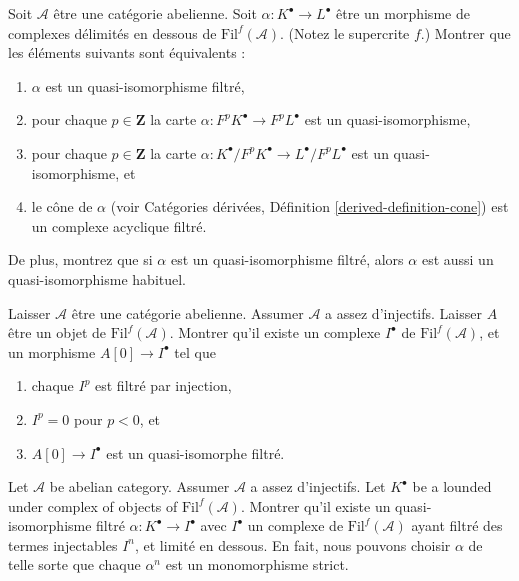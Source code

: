 \begin{exercise}
\label{exercise-filtered-quasi-isomorphism}
Soit $\mathcal{A}$ être une catégorie abelienne.
Soit $\alpha : K^\bullet \to L^\bullet$ être un morphisme de complexes
délimités en dessous de $\text{Fil}^f(\mathcal{A})$. (Notez le supercrite $f$.) Montrer que
les éléments suivants sont équivalents :
\begin{enumerate}
\item $\alpha$ est un quasi-isomorphisme filtré,
\item pour chaque $p \in \mathbf{Z}$
la carte $\alpha : F^pK^\bullet \to F^pL^\bullet$ est un quasi-isomorphisme,
\item pour chaque $p \in
\mathbf{Z}$ la carte $\alpha : K^\bullet/F^pK^\bullet \to L^\bullet/F^pL^\bullet$
est un quasi-isomorphisme, et
\item le cône de
$\alpha$ (voir Catégories dérivées, Définition \ref{derived-definition-cone}) est
un complexe acyclique filtré.
\end{enumerate}
De plus, montrez que si $\alpha$ est un quasi-isomorphisme filtré,
alors $\alpha$ est aussi un quasi-isomorphisme habituel.
\end{exercise}

\begin{exercise}
\label{exercise-injective-resolution}
Laisser $\mathcal{A}$ être une catégorie abelienne.
Assumer $\mathcal{A}$ a assez d'injectifs.
Laisser $A$ être un objet de $\text{Fil}^f(\mathcal{A})$.
Montrer qu'il existe un
complexe $I^\bullet$ de $\text{Fil}^f(\mathcal{A})$, et un
morphisme $A[0] \to I^\bullet$ tel que
\begin{enumerate}
\item chaque $I^p$ est filtré par injection,
\item $I^p = 0$ pour $p < 0$, et
\item $A[0] \to I^\bullet$ est un quasi-isomorphe filtré.
\end{enumerate}
\end{exercise}

\begin{exercise}
\label{exercise-injective-resolution-complex}
Let $\mathcal{A}$ be abelian category. Assumer
$\mathcal{A}$ a assez d'injectifs. Let $K^\bullet$
be a lounded under complex of objects of
$\text{Fil}^f(\mathcal{A})$. Montrer qu'il existe un quasi-isomorphisme filtré
$\alpha : K^\bullet \to I^\bullet$ avec $I^\bullet$ un complexe
de $\text{Fil}^f(\mathcal{A})$ ayant filtré des termes injectables $I^n$,
et limité en dessous. En fait, nous pouvons
choisir $\alpha$ de telle sorte que chaque $\alpha^n$ est
un monomorphisme strict.
\end{exercise}

